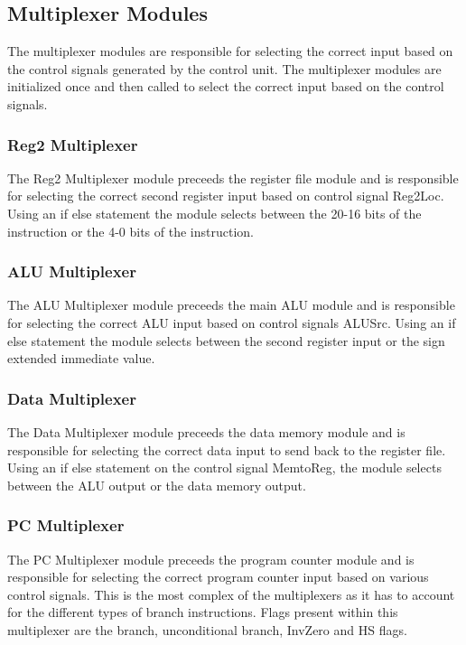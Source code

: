 \documentclass{article}
\begin{document}
\subsection{Multiplexer Modules}
The multiplexer modules are responsible for selecting the correct input based on the control signals generated by the control unit. The multiplexer modules are initialized once and then called to select the correct input based on the control signals.\\
\subsubsection{Reg2 Multiplexer}
The Reg2 Multiplexer module preceeds the register file module and is responsible for selecting the correct second register input based on control signal Reg2Loc. Using an if else statement the module selects between the 20-16 bits of the instruction or the 4-0 bits of the instruction.\\

\subsubsection{ALU Multiplexer}
The ALU Multiplexer module preceeds the main ALU module and is responsible for selecting the correct ALU input based on control signals ALUSrc. Using an if else statement the module selects between the second register input or the sign extended immediate value.\\

\subsubsection{Data Multiplexer}
The Data Multiplexer module preceeds the data memory module and is responsible for selecting the correct data input to send back to the register file. Using an if else statement on the control signal MemtoReg, the module selects between the ALU output or the data memory output.\\

\subsubsection{PC Multiplexer}
The PC Multiplexer module preceeds the program counter module and is responsible for selecting the correct program counter input based on various control signals. This is the most complex of the multiplexers as it has to account for the different types of branch instructions. Flags present within this multiplexer are the branch, unconditional branch, InvZero and HS flags.
\end{document}
